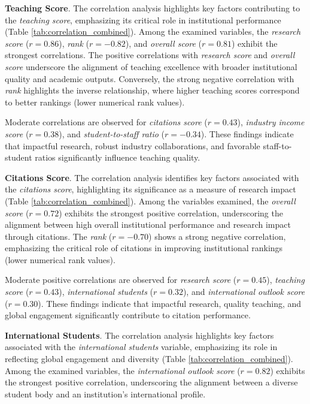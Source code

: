 \documentclass[conference]{IEEEtran}
\begin{document}
\textbf{Teaching Score}. The correlation analysis highlights key factors contributing to the \textit{teaching score}, emphasizing its critical role in institutional performance (Table \ref{tab:correlation_combined}). Among the examined variables, the \textit{research score} ($r = 0.86$), \textit{rank} ($r = -0.82$), and \textit{overall score} ($r = 0.81$) exhibit the strongest correlations. The positive correlations with \textit{research score} and \textit{overall score} underscore the alignment of teaching excellence with broader institutional quality and academic outputs. Conversely, the strong negative correlation with \textit{rank} highlights the inverse relationship, where higher teaching scores correspond to better rankings (lower numerical rank values).

Moderate correlations are observed for \textit{citations score} ($r = 0.43$), \textit{industry income score} ($r = 0.38$), and \textit{student-to-staff ratio} ($r = -0.34$). These findings indicate that impactful research, robust industry collaborations, and favorable staff-to-student ratios significantly influence teaching quality.



\textbf{Citations Score}. The correlation analysis identifies key factors associated with the \textit{citations score}, highlighting its significance as a measure of research impact (Table \ref{tab:correlation_combined}). Among the variables examined, the \textit{overall score} ($r = 0.72$) exhibits the strongest positive correlation, underscoring the alignment between high overall institutional performance and research impact through citations. The \textit{rank} ($r = -0.70$) shows a strong negative correlation, emphasizing the critical role of citations in improving institutional rankings (lower numerical rank values).

Moderate positive correlations are observed for \textit{research score} ($r = 0.45$), \textit{teaching score} ($r = 0.43$), \textit{international students} ($r = 0.32$), and \textit{international outlook score} ($r = 0.30$). These findings indicate that impactful research, quality teaching, and global engagement significantly contribute to citation performance.


\textbf{International Students}. The correlation analysis highlights key factors associated with the \textit{international students} variable, emphasizing its role in reflecting global engagement and diversity (Table \ref{tab:correlation_combined}). Among the examined variables, the \textit{international outlook score} ($r = 0.82$) exhibits the strongest positive correlation, underscoring the alignment between a diverse student body and an institution's international profile.
\end{document}

